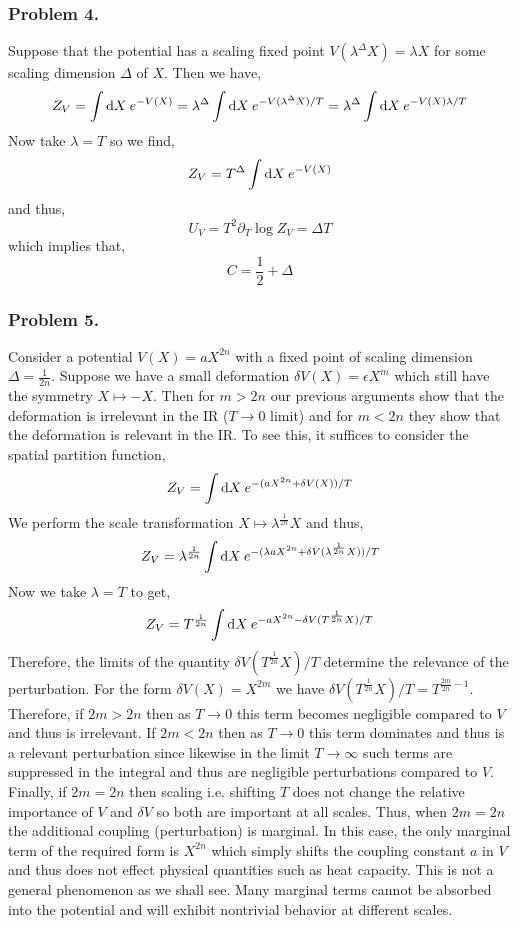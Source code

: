 \documentclass[12pt]{article}
\begin{document}
\subsubsection{Problem 4.} 

Suppose that the potential has a scaling fixed point $V(\lambda^\Delta X) = \lambda X$ for some scaling dimension $\Delta$ of $X$. Then we have,
\[ Z_V = \int \mathrm{d}X \: e^{-V(X)} = \lambda^\Delta \int \mathrm{d}X \: e^{-V(\lambda^\Delta X) / T}  = \lambda^\Delta \int \mathrm{d}X \: e^{-V(X) \lambda/T} \]
Now take $\lambda = T$ so we find,
\[ Z_V = T^\Delta \int \mathrm{d}X \: e^{-V(X)} \]
and thus,
\[ U_V = T^2 \partial_T \log{Z_V} = \Delta T \]
which implies that,
\[ C = \frac{1}{2} + \Delta \]

\subsubsection{Problem 5.} 

Consider a potential $V(X) = a X^{2n}$ with a fixed point of scaling dimension $\Delta = \frac{1}{2n}$. Suppose we have a small deformation $\delta V(X) = \epsilon X^m$ which still have the symmetry $X \mapsto - X$. Then for $m > 2n$ our previous arguments show that the deformation is irrelevant in the IR ($T \to 0$ limit) and for $m < 2n$ they show that the deformation is relevant in the IR. To see this, it suffices to consider the spatial partition function,
\begin{align*}
Z_V = \int \mathrm{d}X \: e^{-(aX^{2n} + \delta V(X)) / T}
\end{align*}
We perform the scale transformation $X \mapsto \lambda^{\frac{1}{2n}} X$ and thus,
\begin{align*}
Z_V = \lambda^{\frac{1}{2 n}} \int \mathrm{d}X \: e^{-(\lambda a X^{2n} + \delta V(\lambda^{\frac{1}{2 n}} X)) / T}
\end{align*}
Now we take $\lambda = T$ to get,
\begin{align*}
Z_V = T^{\frac{1}{2 n}} \int \mathrm{d}X \: e^{- a X^{2n} - \delta V(T^{\frac{1}{2 n}} X) / T}
\end{align*}
Therefore, the limits of the quantity $\delta V(T^{\frac{1}{2n}} X)/T$ determine the relevance of the perturbation. For the form $\delta V(X) = X^{2m}$ we have $\delta V(T^{\frac{1}{2n}} X) / T = T^{\frac{2m}{2n} - 1}$. Therefore, if $2 m > 2n$ then as $T \to 0$ this term becomes negligible compared to $V$ and thus is irrelevant. If $2 m < 2n$ then as $T \to 0$ this term dominates and thus is a relevant perturbation since likewise in the limit $T \to \infty$ such terms are suppressed in the integral and thus are negligible perturbations compared to $V$. Finally, if $2 m = 2 n$ then scaling i.e. shifting $T$ does not change the relative importance of $V$ and $\delta V$ so both are important at all scales. Thus, when $2m = 2n$ the additional coupling (perturbation) is marginal. In this case, the only marginal term of the required form is $X^{2n}$ which simply shifts the coupling constant $a$ in $V$ and thus does not effect physical quantities such as heat capacity. This is not a general phenomenon as we shall see. Many marginal terms cannot be absorbed into the potential and will exhibit nontrivial behavior at different scales.    
\end{document}
